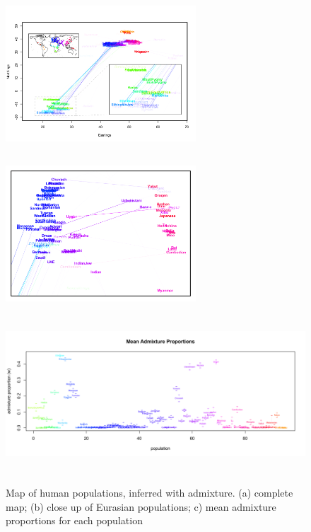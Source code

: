 \documentclass[12pt]{article}
\begin{document}
\begin{figure}
	\centering
			{\includegraphics[width=2.8in,height=2.3in]{figs/globetrotter/globe_Ad_map_AfricaInset.png}}
			{\includegraphics[width=2.8in,height=2.3in]{figs/globetrotter/eurasia_Ad_map_indproc.png}}
			{\includegraphics[width=5.6in,height=2.33in]{figs/globetrotter/globe_Ad_proportions.png}}
	\caption{Map of human populations, inferred with admixture. (a) complete map; (b) close up of Eurasian populations; c) mean admixture proportions for each population}\label{sfig:globe_ad_maps}
\end{figure}
\end{document}
